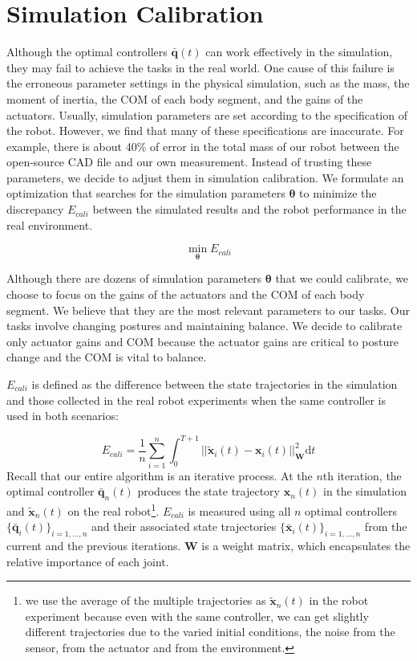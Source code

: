 \section{Simulation Calibration}
Although the optimal controllers $\bar{\mathbf{q}}(t)$ can work effectively in the simulation, they may fail to achieve the tasks in the real world. One cause of this failure is the erroneous parameter settings in the physical simulation, such as the mass, the moment of inertia, the COM of each body segment, and the gains of the actuators. Usually, simulation parameters are set according to the specification of the robot. However, we find that many of these specifications are inaccurate. For example, there is about 40\% of error in the total mass of our robot between the open-source CAD file and our own measurement. Instead of trusting these parameters, we decide to adjust them in simulation calibration. We formulate an optimization that searches for the simulation parameters $\mathbf{\theta}$ to minimize the discrepancy $E_{cali}$ between the simulated results and the robot performance in the real environment.

\begin{equation}
 \min_{\mathbf{\theta}} E_{cali}
\label{eqn:calibration}
\end{equation}

Although there are dozens of simulation parameters $\mathbf{\theta}$ that we could calibrate, we choose to focus on the gains of the actuators and the COM of each body segment. We believe that they are the most relevant parameters to our tasks. Our tasks involve changing postures and maintaining balance. We decide to calibrate only actuator gains and COM because the actuator gains are critical to posture change and the COM is vital to balance.

$E_{cali}$ is defined as the difference between the state trajectories in the simulation and those collected in the real robot experiments when the same controller is used in both scenarios:

\begin{equation}
  E_{cali}=\frac{1}{n}\sum_{i=1}^{n}\int_{0}^{T+1}||\tilde{\mathbf{x}}_i(t)-\mathbf{x}_i(t)||_{\mathbf{W}}^2\mathrm{d}t
  \label{eqn:calibrationObj}
\end{equation}
Recall that our entire algorithm is an iterative process. At the $n$th iteration, the optimal controller $\bar{\mathbf{q}}_n(t)$ produces the state trajectory $\mathbf{x}_n(t)$ in the simulation and $\tilde{\mathbf{x}}_n(t)$ on the real robot\footnote{we use the average of the multiple trajectories as $\tilde{\mathbf{x}}_n(t)$ in the robot experiment because even with the same controller, we can get slightly different trajectories due to the varied initial conditions, the noise from the sensor, from the actuator and from the environment.}. $E_{cali}$ is measured using all $n$ optimal controllers $\{\bar{\mathbf{q}}_i(t)\}_{i=1,...,n}$ and their associated state trajectories $\{\bar{\mathbf{x}}_i(t)\}_{i=1,...,n}$ from the current and the previous iterations. $\mathbf{W}$ is a weight matrix, which encapsulates the relative importance of each joint.

